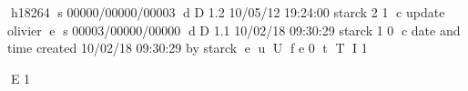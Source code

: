 h18264
s 00000/00000/00003
d D 1.2 10/05/12 19:24:00 starck 2 1
c update olivier
e
s 00003/00000/00000
d D 1.1 10/02/18 09:30:29 starck 1 0
c date and time created 10/02/18 09:30:29 by starck
e
u
U
f e 0
t
T
I 1

\printindex
E 1
